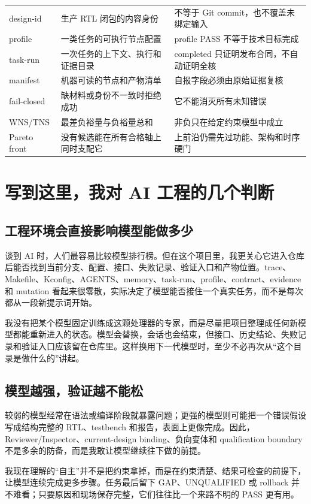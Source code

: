 \documentclass[UTF8,a4paper,zihao=-4,oneside]{ctexart}
\begin{document}
\begin{longtable}{@{}L{34mm}L{63mm}L{47mm}@{}}
  design-id & 生产 RTL 闭包的内容身份 & 不等于 Git commit，也不覆盖未绑定输入 \\
  profile & 一类任务的可执行节点配置 & profile PASS 不等于技术目标完成 \\
  task-run & 一次任务的上下文、执行和证据目录 & completed 只证明发布合同，不自动证明全核 \\
  manifest & 机器可读的节点和产物清单 & 自报字段必须由原始证据复核 \\
  fail-closed & 缺材料或身份不一致时拒绝成功 & 它不能消灭所有未知错误 \\
  WNS/TNS & 最差负裕量与负裕量总和 & 非负只在给定约束模型中成立 \\
  Pareto front & 没有候选能在所有合格轴上同时支配它 & 上前沿仍需先过功能、架构和时序硬门 \\
\end{longtable}

\section{写到这里，我对 AI 工程的几个判断}

\subsection{工程环境会直接影响模型能做多少}

谈到 AI 时，人们最容易比较模型排行榜。但在这个项目里，我更关心它进入仓库后能否找到当前分支、配置、接口、失败记录、验证入口和产物位置。trace、Makefile、Kconfig、AGENTS、memory、task-run、profile、contract、evidence 和 mutation 看起来很零散，实际决定了模型能否接住一个真实任务，而不是每次都从一段新提示词开始。

我没有把某个模型固定训练成这颗处理器的专家，而是尽量把项目整理成任何新模型都能重新进入的状态。模型会替换，会话也会结束，但接口、历史结论、失败记录和验证入口应该留在仓库里。这样换用下一代模型时，至少不必再次从“这个目录是做什么的”讲起。

\subsection{模型越强，验证越不能松}

较弱的模型经常在语法或编译阶段就暴露问题；更强的模型则可能把一个错误假设写成结构完整的 RTL、testbench 和报告，表面上更像完成。因此，Reviewer/Inspector、current-design binding、负向变体和 qualification boundary 不是多余的防备，而是我敢让模型继续往下做的前提。

我现在理解的“自主”并不是把约束拿掉，而是在约束清楚、结果可检查的前提下，让模型连续完成更多步骤。任务最后留下 GAP、UNQUALIFIED 或 rollback 并不难看；只要原因和现场保存完整，它们往往比一个来路不明的 PASS 更有用。
\end{document}
